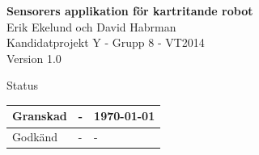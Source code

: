 \documentclass[a4paper,12pt,fleqn]{article}
\begin{document}
	\pagestyle{fancy}
	\vspace*{\fill}
		\begingroup
			\begin{center}
				\huge{\textbf{Sensorers applikation för kartritande robot}}
				\\
				\vspace{10pt}
				\normalsize
				Erik Ekelund och David Habrman
				\\
				Kandidatprojekt Y - Grupp 8 - VT2014
				\\
				Version 1.0
				\end{center}
		\endgroup
	\vspace*{\fill}
	
	\begin{center} %
		Status
		\\
		\vspace{3pt} %
	    \begin{tabular}{| p{3cm} | p{3cm} | p{3cm} |} %
	    \hline %
	    Granskad & - & \today \\ \hline %
		Godkänd & - & - \\ \hline %

	    \end{tabular}
	\end{center}
	\vspace{2cm}
	\newpage
	
\end{document}
